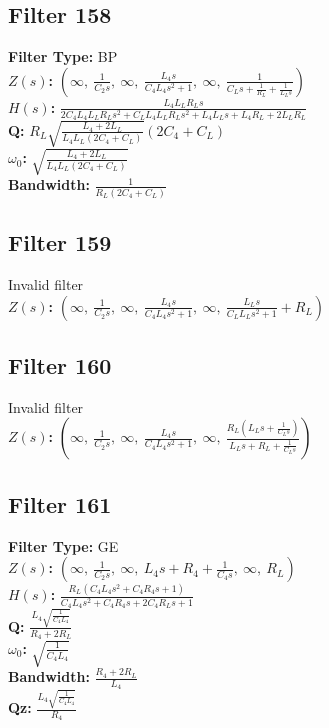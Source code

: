 \documentclass{article}
\begin{document}
\subsection*{Filter 158}
\textbf{Filter Type:} BP \\ 
\textbf{$Z(s)$:} $\left( \infty, \  \frac{1}{C_{2} s}, \  \infty, \  \frac{L_{4} s}{C_{4} L_{4} s^{2} + 1}, \  \infty, \  \frac{1}{C_{L} s + \frac{1}{R_{L}} + \frac{1}{L_{L} s}}\right)$ \\ 
\textbf{$H(s)$:} $\frac{L_{4} L_{L} R_{L} s}{2 C_{4} L_{4} L_{L} R_{L} s^{2} + C_{L} L_{4} L_{L} R_{L} s^{2} + L_{4} L_{L} s + L_{4} R_{L} + 2 L_{L} R_{L}}$ \\ 
\textbf{Q:} $R_{L} \sqrt{\frac{L_{4} + 2 L_{L}}{L_{4} L_{L} \left(2 C_{4} + C_{L}\right)}} \left(2 C_{4} + C_{L}\right)$ \\ 
\textbf{$\omega_0$:} $\sqrt{\frac{L_{4} + 2 L_{L}}{L_{4} L_{L} \left(2 C_{4} + C_{L}\right)}}$ \\ 
\textbf{Bandwidth:} $\frac{1}{R_{L} \left(2 C_{4} + C_{L}\right)}$ \\ 
\subsection*{Filter 159}
Invalid filter \\ 
\textbf{$Z(s)$:} $\left( \infty, \  \frac{1}{C_{2} s}, \  \infty, \  \frac{L_{4} s}{C_{4} L_{4} s^{2} + 1}, \  \infty, \  \frac{L_{L} s}{C_{L} L_{L} s^{2} + 1} + R_{L}\right)$ \\ 
\subsection*{Filter 160}
Invalid filter \\ 
\textbf{$Z(s)$:} $\left( \infty, \  \frac{1}{C_{2} s}, \  \infty, \  \frac{L_{4} s}{C_{4} L_{4} s^{2} + 1}, \  \infty, \  \frac{R_{L} \left(L_{L} s + \frac{1}{C_{L} s}\right)}{L_{L} s + R_{L} + \frac{1}{C_{L} s}}\right)$ \\ 
\subsection*{Filter 161}
\textbf{Filter Type:} GE \\ 
\textbf{$Z(s)$:} $\left( \infty, \  \frac{1}{C_{2} s}, \  \infty, \  L_{4} s + R_{4} + \frac{1}{C_{4} s}, \  \infty, \  R_{L}\right)$ \\ 
\textbf{$H(s)$:} $\frac{R_{L} \left(C_{4} L_{4} s^{2} + C_{4} R_{4} s + 1\right)}{C_{4} L_{4} s^{2} + C_{4} R_{4} s + 2 C_{4} R_{L} s + 1}$ \\ 
\textbf{Q:} $\frac{L_{4} \sqrt{\frac{1}{C_{4} L_{4}}}}{R_{4} + 2 R_{L}}$ \\ 
\textbf{$\omega_0$:} $\sqrt{\frac{1}{C_{4} L_{4}}}$ \\ 
\textbf{Bandwidth:} $\frac{R_{4} + 2 R_{L}}{L_{4}}$ \\ 
\textbf{Qz:} $\frac{L_{4} \sqrt{\frac{1}{C_{4} L_{4}}}}{R_{4}}$ \\ 
\end{document}
